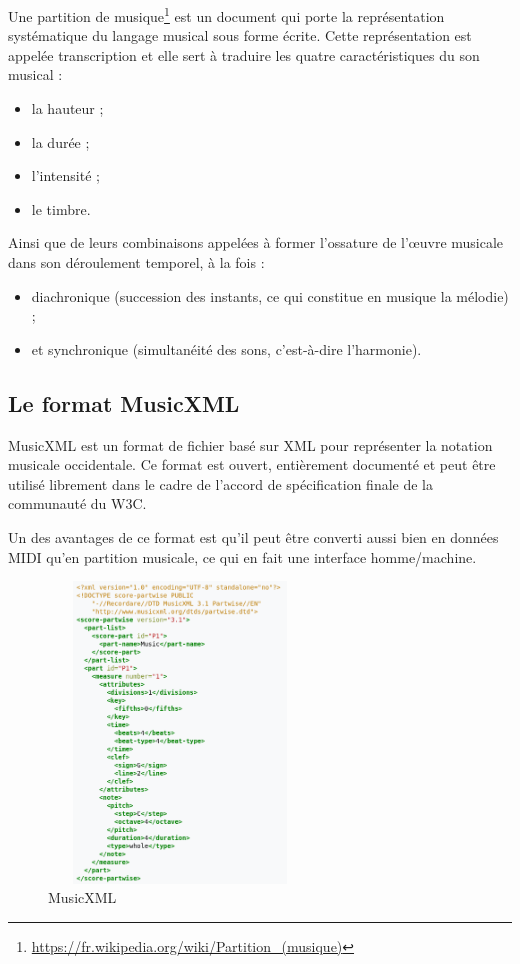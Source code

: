 Une partition de musique\footnote{\url{https://fr.wikipedia.org/wiki/Partition\_(musique)}} est un document qui porte la représentation systématique du langage musical sous forme écrite. Cette représentation est appelée transcription et elle sert à traduire les quatre caractéristiques du son musical :
\begin{itemize}
	\item la hauteur ;
	\item la durée ;
	\item l'intensité ;
	\item le timbre.
\end{itemize}

Ainsi que de leurs combinaisons appelées à former l'ossature de l'œuvre musicale dans son déroulement temporel, à la fois :
\begin{itemize}
	\item diachronique (succession des instants, ce qui constitue en musique la mélodie) ;
	\item et synchronique (simultanéité des sons, c'est-à-dire l'harmonie).
\end{itemize}

\subsection*{Le format MusicXML}
MusicXML est un format de fichier basé sur XML pour représenter la notation musicale occidentale. Ce format est ouvert, entièrement documenté et peut être utilisé librement dans le cadre de l'accord de spécification finale de la communauté du W3C.

Un des avantages de ce format est qu’il peut être converti aussi bien en données MIDI qu’en partition musicale, ce qui en fait une interface homme/machine.

\begin{figure}[h]
	\centering
	\includegraphics[height=80mm, width=70mm]{z_images/1_contexte/6_musicxml.png}
	\caption{MusicXML}
	\label{MusicXML}
\end{figure}

